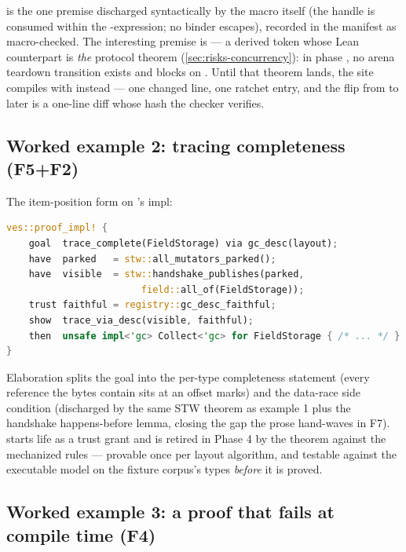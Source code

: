  is the one premise discharged
syntactically by the macro itself (the handle is consumed within the
-expression; no binder escapes), recorded in the manifest
as macro-checked. The interesting premise is
 --- a derived token whose Lean
counterpart is \emph{the} protocol theorem
(\cref{sec:risks-concurrency}): in phase , no arena
teardown transition exists and  blocks on
. Until that theorem lands, the site compiles
with  instead ---
one changed line, one ratchet entry, and the flip from
 to  later is a one-line diff whose hash
the checker verifies.

\subsection{Worked example 2: tracing completeness (F5+F2)}

The item-position form on 's  impl:

\begin{lstlisting}[language=Rust,
  morekeywords={goal,have,show,then,trust,note}]
ves::proof_impl! {
    goal  trace_complete(FieldStorage) via gc_desc(layout);
    have  parked   = stw::all_mutators_parked();
    have  visible  = stw::handshake_publishes(parked,
                        field::all_of(FieldStorage));
    trust faithful = registry::gc_desc_faithful;
    show  trace_via_desc(visible, faithful);
    then  unsafe impl<'gc> Collect<'gc> for FieldStorage { /* ... */ }
}
\end{lstlisting}

Elaboration splits the goal into the per-type completeness statement
(every reference the bytes contain sits at an offset 
marks) and the data-race side condition (discharged by the same STW
theorem as example 1 plus the handshake happens-before lemma, closing
the gap the prose hand-waves in F7).  starts
life as a trust grant and is retired in Phase 4 by the
 theorem against the mechanized 
rules --- provable once per layout algorithm, and testable against the
executable model on the fixture corpus's types \emph{before} it is
proved.

\subsection{Worked example 3: a proof that fails at compile time (F4)}
\label{sec:dsl-example-fail}

